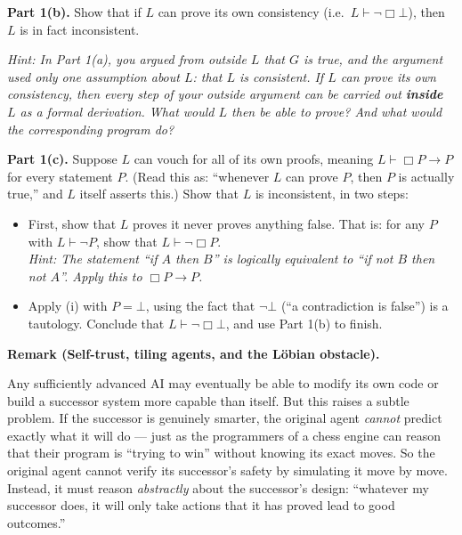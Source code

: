 \documentclass[11pt]{article}
\begin{document}
\begin{exercise}
\medskip
\noindent
\textbf{Part 1(b).} Show that if $L$ can prove its own consistency (i.e.\
$L \vdash \neg\Box\bot$), then $L$ is in fact inconsistent.

\medskip
\noindent
\emph{Hint: In Part 1(a), you argued from outside $L$ that $G$ is true, and the
argument used only one assumption about $L$: that $L$ is consistent. If $L$ can prove
its own consistency, then every step of your outside argument can be carried out
\textbf{inside} $L$ as a formal derivation. What would $L$ then be able to prove?
And what would the corresponding program do?}

\medskip
\noindent
\textbf{Part 1(c).} Suppose $L$ can vouch for all of its own proofs, meaning
$L \vdash \Box P \to P$ for every statement $P$. (Read this as: ``whenever $L$ can
prove $P$, then $P$ is actually true,'' and $L$ itself asserts this.) Show that $L$ is
inconsistent, in two steps:

\begin{itemize}
  \item[(i)] First, show that $L$ proves it never proves anything false. That is: for
    any $P$ with $L \vdash \neg P$, show that $L \vdash \neg\Box P$.\\
    \emph{Hint: The statement ``if $A$ then $B$'' is logically equivalent to ``if not
    $B$ then not $A$''. Apply this to $\Box P \to P$.}
  \item[(ii)] Apply (i) with $P = \bot$, using the fact that $\neg\bot$ (``a
    contradiction is false'') is a tautology. Conclude that
    $L \vdash \neg\Box\bot$, and use Part 1(b) to finish.
\end{itemize}

\medskip
\noindent
\textbf{Remark (Self-trust, tiling agents, and the L\"obian obstacle).}

\medskip
\noindent
Any sufficiently advanced AI may eventually be able to modify its own code or build a
successor system more capable than itself. But this raises a subtle problem. If the
successor is genuinely smarter, the original agent \emph{cannot} predict exactly what
it will do --- just as the programmers of a chess engine can reason that their program
is ``trying to win'' without knowing its exact moves. So the original agent cannot
verify its successor's safety by simulating it move by move. Instead, it must reason
\emph{abstractly} about the successor's design: ``whatever my successor does, it will
only take actions that it has proved lead to good outcomes.''


\end{exercise}
\end{document}
